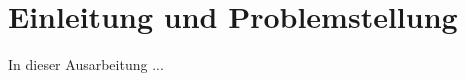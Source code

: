 \chapter{Einleitung und Problemstellung}
\label{chap: Einleitung und Problemstellung}
In dieser Ausarbeitung ...
